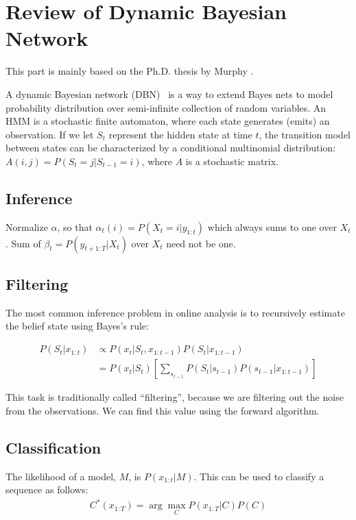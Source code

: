 \chapter{Review of Dynamic Bayesian Network}\label{app:dbn}
This part is mainly based on the Ph.D. thesis by Murphy \cite{murphy02}.

A dynamic Bayesian network (DBN)~\cite{dean89} is a way to extend Bayes nets to
model probability distribution over semi-infinite collection  of random variables. An
HMM is a stochastic finite automaton, where each state generates (emits) an observation. If we let $S_t$ represent the hidden state at time $t$, the
transition model between states can be characterized by a conditional
multinomial distribution: $A(i, j) = P(S_t = j | S_{t-1} = i)$, where $A$ is a
stochastic matrix.

\section{Inference}
Normalize $\alpha$, so that $\alpha_t(i) = P(X_t = i | y_{1:t})$ which always
sums to one over $X_t$. Sum of $\beta_t = P(y_{t+1:T}|X_t)$ over $X_t$ need not
be one.

\section{Filtering}
The most common inference problem in online analysis is to recursively estimate
the belief state using Bayes's rule:

\begin{align*}
P(S_t | x_{1:t}) & \propto P(x_t | S_t, x_{1:t-1})P(S_t | x_{1:t-1}) \\
         & = P(x_t | S_t) \left[\sum_{s_{t - 1}}
           P(S_t | s_{t - 1})P(s_{t - 1} | x_{1:t - 1})\right]
\end{align*}

This task is traditionally called ``filtering'', because we are filtering out
the noise from the observations. We can find this value using the forward
algorithm.

\section{Classification}
The likelihood of a model, $M$, is $P(x_{1:t}|M)$. This can be used to classify
a sequence as follows:
\begin{align*}
C^*(x_{1:T}) = \arg \max_{C} P(x_{1:T} | C)P(C)
\end{align*}
